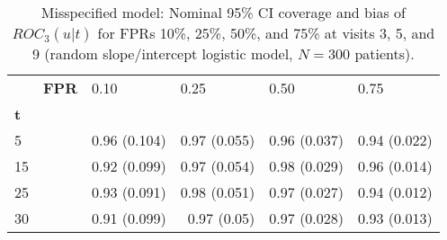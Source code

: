 \begin{table}[ht]
\centering
\begin{tabular}{ll |rrrr}
  \hline
             & \textbf{FPR} & \multicolumn{1}{l}{         0.10} & \multicolumn{1}{l}{         0.25} & \multicolumn{1}{l}{         0.50} & \multicolumn{1}{l}{         0.75} \\ 
  \textbf{t} &               & \multicolumn{1}{l}{             } & \multicolumn{1}{l}{             } & \multicolumn{1}{l}{             } & \multicolumn{1}{l}{             } \\ 
   \hline
5           &               & 0.96 (0.104) & 0.97 (0.055) & 0.96 (0.037) & 0.94 (0.022) \\ 
  15          &               & 0.92 (0.099) & 0.97 (0.054) & 0.98 (0.029) & 0.96 (0.014) \\ 
  25          &               & 0.93 (0.091) & 0.98 (0.051) & 0.97 (0.027) & 0.94 (0.012) \\ 
  30          &               & 0.91 (0.099) & 0.97 (0.05)  & 0.97 (0.028) & 0.93 (0.013) \\ 
   \hline
\end{tabular}
\caption{Misspecified model: Nominal 95\% CI coverage and bias of $ROC_3(u|t)$ for FPRs 10\%, 25\%, 50\%, and 75\% at visits 3, 5, and 9 (random slope/intercept logistic model, $N=300$ patients).} 
\label{tab:2}
\end{table}
